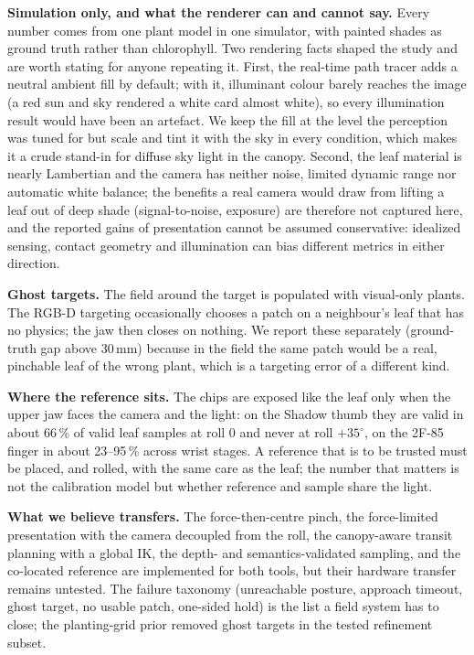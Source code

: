 \documentclass[letterpaper, 10 pt, conference]{ieeeconf}
\begin{document}
\textbf{Simulation only, and what the renderer can and cannot say.} Every number comes from one
plant model in one simulator, with painted shades as ground truth rather than chlorophyll.
Two rendering facts shaped the study and are worth stating for anyone repeating it. First,
the real-time path tracer adds a neutral ambient fill by default; with it, illuminant
colour barely reaches the image (a red sun and sky rendered a white card almost white), so
every illumination result would have been an artefact. We keep the fill at the level the
perception was tuned for but scale and tint it with the sky in every condition, which makes it
a crude stand-in for diffuse sky light in the canopy. Second, the leaf material is nearly
Lambertian and the camera has neither noise, limited dynamic range nor automatic white
balance; the benefits a real camera would draw from lifting a leaf out of deep shade
(signal-to-noise, exposure) are therefore not captured here, and the reported gains of
presentation cannot be assumed conservative: idealized sensing, contact geometry and
illumination can bias different metrics in either direction.

\textbf{Ghost targets.} The field around the target is populated with visual-only plants.
The RGB-D targeting occasionally chooses a patch on a neighbour's leaf that has no physics;
the jaw then closes on nothing. We report these separately (ground-truth gap above 30\,mm)
because in the field the same patch would be a real, pinchable leaf of the wrong plant, which
is a targeting error of a different kind.

\textbf{Where the reference sits.} The chips are exposed like the leaf only when the upper
jaw faces the camera and the light: on the Shadow thumb they are valid in about 66\,\% of valid leaf
samples at roll 0 and never at roll $+35^\circ$, on the 2F-85 finger in about 23--95\,\% across wrist stages. A reference that
is to be trusted must be placed, and rolled, with the same care as the leaf; the number
that matters is not the calibration model but whether reference and sample share the light.

\textbf{What we believe transfers.} The force-then-centre pinch, the force-limited presentation
with the camera decoupled from the roll, the canopy-aware transit planning with a global IK,
the depth- and semantics-validated sampling, and the co-located reference are
implemented for both tools, but their hardware transfer remains untested. The failure taxonomy (unreachable posture, approach timeout,
ghost target, no usable patch, one-sided hold) is the list a field system has to close; the
planting-grid prior removed ghost targets in the tested refinement subset.
\end{document}
